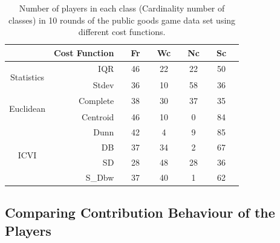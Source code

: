 \begin{table}[!h]
    \small
    \centering
    \caption{Number of players in each class (Cardinality number of classes) in 10 rounds of the public goods game data set using different cost functions.}
    \label{tab:NumberOfClassMembershippGG10}
    \begin{tabular}{@{}crccccccccc@{}}
        \toprule
        &Cost Function & \phantom{abc}  & Fr & \phantom{a} & Wc & \phantom{a} & Nc & \phantom{a} & Sc & \phantom{a} \\
        \midrule
        \multirow{2}{*}{\begin{turn}{90}{\scriptsize Statistics}\end{turn}}
        & IQR           & \phantom{abc} & 46 & \phantom{a} & 22 & \phantom{a} & 22 & \phantom{a} & 50 & \phantom{a}\\
        & Stdev         & \phantom{abc} & 36 & \phantom{a} & 10 & \phantom{a} & 58 & \phantom{a} & 36 & \phantom{a}\\
        
        \midrule
        \multirow{2}{*}{\begin{turn}{90}{\scriptsize Euclidean}\end{turn}}
        & Complete      & \phantom{abc} & 38 & \phantom{a} & 30 & \phantom{a} & 37 & \phantom{a} & 35 & \phantom{a}\\
        & Centroid      & \phantom{abc} & 46 & \phantom{a} & 10 & \phantom{a} & 0  & \phantom{a} & 84 & \phantom{a}\\
        
        \midrule
        \multirow{4}{*}{\begin{turn}{90}{\scriptsize ICVI }\end{turn}}
        & Dunn          & \phantom{abc} & 42 & \phantom{a} & 4  & \phantom{a} & 9  & \phantom{a} & 85 & \phantom{a}\\
        & DB            & \phantom{abc} & 37 & \phantom{a} & 34 & \phantom{a} & 2  & \phantom{a} & 67 & \phantom{a}\\
        & SD            & \phantom{abc} & 28 & \phantom{a} & 48 & \phantom{a} & 28 & \phantom{a} & 36 & \phantom{a}\\
        & S\_Dbw        & \phantom{abc} & 37 & \phantom{a} & 40 & \phantom{a} & 1  & \phantom{a} & 62 & \phantom{a}\\
        \bottomrule
    \end{tabular}
\end{table}

\subsection{Comparing Contribution Behaviour of the Players}

